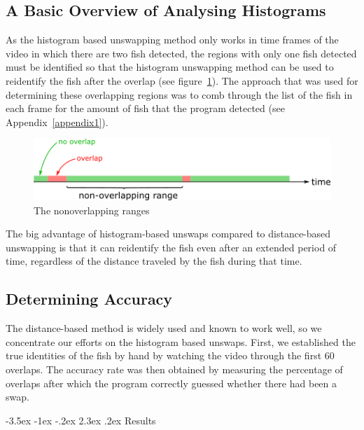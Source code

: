 \documentclass{article}
\makeatletter
\renewcommand\section{\clearpage\newpage\@startsection {section}{1}{\z@}%
	{-3.5ex \@plus -1ex \@minus -.2ex}%
	{2.3ex \@plus.2ex}%
	{\normalfont\Large\bfseries}}
\makeatother
\begin{document}
\subsection{A Basic Overview of Analysing Histograms}
\label{sec:Histogram Based Unswapping 2}

As the histogram based unswapping method only works in time frames of the video in which there are two fish detected, the regions with only one fish detected must be identified so that the histogram unswapping method can be used to reidentify the fish after the overlap (see figure~\ref{fig:nonoverlappingRange}). The approach that was used for determining these overlapping regions was to comb through the list of the fish in each frame for the amount of fish that the program detected (see Appendix~\ref{appendix1}).

\begin{figure}[H]
	\centering
	\includegraphics[width=\linewidth]{nonoverlappingRange}
	\caption{The nonoverlapping ranges}
	\label{fig:nonoverlappingRange}
\end{figure}

The big advantage of histogram-based unswaps compared to distance-based unswapping is that it can reidentify the fish even after an extended period of time, regardless of the distance traveled by the fish during that time.

\subsection{Determining Accuracy}
\label{sec:Determining Accuracy}

The distance-based method is widely used and known to work well, so we concentrate our efforts on the histogram based unswaps. First, we established the true identities of the fish by hand by watching the video through the first 60 overlaps. The accuracy rate was then obtained by measuring the percentage of overlaps after which the program correctly guessed whether there had been a swap.

\section{Results}
\label{sec:Results}
\end{document}
